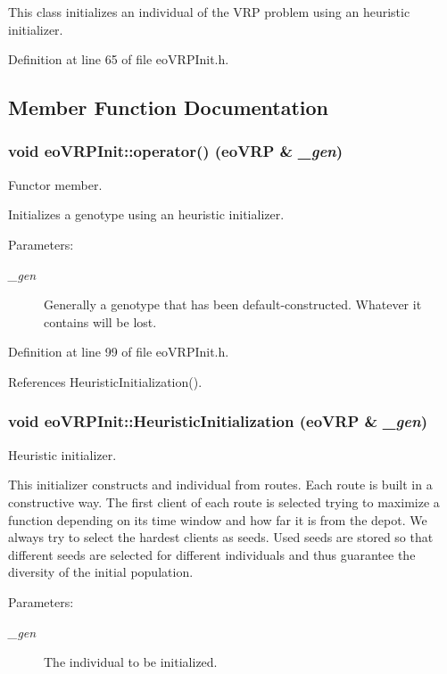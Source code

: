 This class initializes an individual of the VRP problem using an heuristic initializer. 



Definition at line 65 of file eo\-VRPInit.h.

\subsection{Member Function Documentation}
\subsubsection{\setlength{\rightskip}{0pt plus 5cm}void eo\-VRPInit::operator() (\bf{eo\-VRP} \& {\em \_\-gen})\hspace{0.3cm}{\tt  [inline]}}\label{classeo_v_r_p_init_8bc4f6fb201b09dd882d721d2cfef8ce}


Functor member. 

Initializes a genotype using an heuristic initializer. \begin{Desc}
\item[Parameters:]
\begin{description}
\item[{\em \_\-gen}]Generally a genotype that has been default-constructed. Whatever it contains will be lost. \end{description}
\end{Desc}


Definition at line 99 of file eo\-VRPInit.h.

References Heuristic\-Initialization().
\subsubsection{\setlength{\rightskip}{0pt plus 5cm}void eo\-VRPInit::Heuristic\-Initialization (\bf{eo\-VRP} \& {\em \_\-gen})\hspace{0.3cm}{\tt  [inline, private]}}\label{classeo_v_r_p_init_af5946da88fb14494cb23dc21d167866}


Heuristic initializer. 

This initializer constructs and individual from routes. Each route is built in a constructive way. The first client of each route is selected trying to maximize a function depending on its time window and how far it is from the depot. We always try to select the hardest clients as seeds. Used seeds are stored so that different seeds are selected for different individuals and thus guarantee the diversity of the initial population. \begin{Desc}
\item[Parameters:]
\begin{description}
\item[{\em \_\-gen}]The individual to be initialized. \end{description}
\end{Desc}


